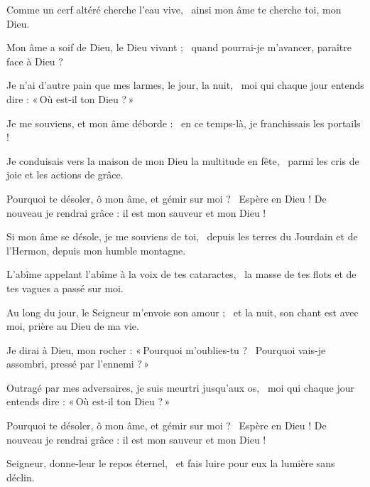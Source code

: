 \item Comme un cerf altéré cherche l'eau vive,~\psstar{} ainsi mon âme te cherche toi, mon Dieu.

\item Mon âme a soif de Dieu, le Dieu vivant ;~\psstar{} quand pourrai-je m'avancer, paraître face à Dieu ?

\item Je n'ai d'autre pain que mes larmes, le jour, la nuit,~\psstar{} moi qui chaque jour entends dire : «\,Où est-il ton Dieu ?\,»

\item Je me souviens, et mon âme déborde :~\psstar{} en ce temps-là, je franchissais les portails ! 

\item Je conduisais vers la maison de mon Dieu la multitude en fête,~\psstar{} parmi les cris de joie et les actions de grâce.

\item Pourquoi te désoler, ô mon âme, et gémir sur moi ?~\psstar{} Espère en Dieu ! De nouveau je rendrai grâce : il est mon sauveur et mon Dieu !

\item Si mon âme se désole, je me souviens de toi,~\psstar{} depuis les terres du Jourdain et de l'Hermon, depuis mon humble montagne.

\item L'abîme appelant l'abîme à la voix de tes cataractes,~\psstar{} la masse de tes flots et de tes vagues a passé sur moi.

\item Au long du jour, le Seigneur m'envoie son amour ;~\psstar{} et la nuit, son chant est avec moi, prière au Dieu de ma vie.

\item Je dirai à Dieu, mon rocher : «\,Pourquoi m'oublies-tu ?~\psstar{} Pourquoi vais-je assombri, pressé par l'ennemi ?\,»

\item Outragé par mes adversaires, je suis meurtri jusqu'aux os,~\psstar{} moi qui chaque jour entends dire : «\,Où est-il ton Dieu ?\,»

\item Pourquoi te désoler, ô mon âme, et gémir sur moi ?~\psstar{} Espère en Dieu ! De nouveau je rendrai grâce : il est mon sauveur et mon Dieu !

\item Seigneur, donne-leur le repos éternel,~\psstar{} et fais luire pour eux la lumière sans déclin.